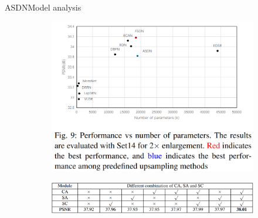 \documentclass[
    xcolor={svgnames},
    hyperref={colorlinks,citecolor=OrangeRed,linkcolor=OrangeRed,urlcolor=DarkBlue}
    ]{beamer}
\begin{document}
\begin{frame}{ASDN}{Model analysis}
    \begin{figure}
        \begin{subfigure}{\textwidth}
            \centering
            \includegraphics[height=0.5\textheight,keepaspectratio]{asdn-psnr-n_params.png}                
        \end{subfigure}
        \begin{subfigure}{\textwidth}
            \centering
            \includegraphics[scale=0.2]{asdn-ablation-study.png}
        \end{subfigure}
    \end{figure}
\end{frame}
\end{document}
